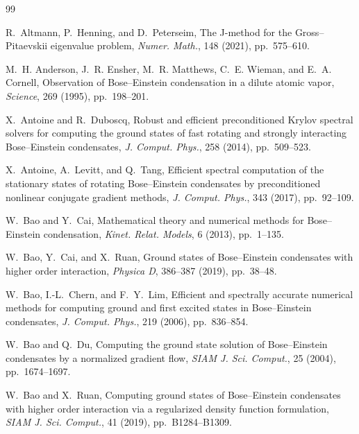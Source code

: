 \documentclass[11pt]{article}
\theoremstyle{plain}
\theoremstyle{definition}
\numberwithin{equation}{section}
\begin{document}
\begin{thebibliography}{99}

R.~Altmann, P.~Henning, and D.~Peterseim,
\newblock The J-method for the Gross--Pitaevskii eigenvalue problem,
\newblock \emph{Numer. Math.}, 148 (2021), pp.~575--610.

M.~H. Anderson, J.~R. Ensher, M.~R. Matthews, C.~E. Wieman,
and E.~A. Cornell,
\newblock Observation of Bose--Einstein condensation in a dilute
atomic vapor,
\newblock \emph{Science}, 269 (1995), pp.~198--201.

X.~Antoine and R.~Duboscq,
\newblock Robust and efficient preconditioned Krylov spectral solvers
for computing the ground states of fast rotating and strongly
interacting Bose--Einstein condensates,
\newblock \emph{J. Comput. Phys.}, 258 (2014), pp.~509--523.

X.~Antoine, A.~Levitt, and Q.~Tang,
\newblock Efficient spectral computation of the stationary states of
rotating Bose--Einstein condensates by preconditioned nonlinear
conjugate gradient methods,
\newblock \emph{J. Comput. Phys.}, 343 (2017), pp.~92--109.

W.~Bao and Y.~Cai,
\newblock Mathematical theory and numerical methods for Bose--Einstein condensation,
\newblock \emph{Kinet. Relat. Models}, 6 (2013), pp.~1--135.

W.~Bao, Y.~Cai, and X.~Ruan,
\newblock Ground states of Bose--Einstein condensates with higher order interaction,
\newblock \emph{Physica D}, 386--387 (2019), pp.~38--48.

W.~Bao, I.-L.~Chern, and F.~Y.~Lim,
\newblock Efficient and spectrally accurate numerical methods for
computing ground and first excited states in Bose--Einstein
condensates,
\newblock \emph{J. Comput. Phys.}, 219 (2006), pp.~836--854.

W.~Bao and Q.~Du,
\newblock Computing the ground state solution of Bose--Einstein condensates by a
normalized gradient flow,
\newblock \emph{SIAM J. Sci. Comput.}, 25 (2004), pp.~1674--1697.

W.~Bao and X.~Ruan,
\newblock Computing ground states of Bose--Einstein condensates with higher order
interaction via a regularized density function formulation,
\newblock \emph{SIAM J. Sci. Comput.}, 41 (2019), pp.~B1284--B1309.


\end{thebibliography}
\end{document}
